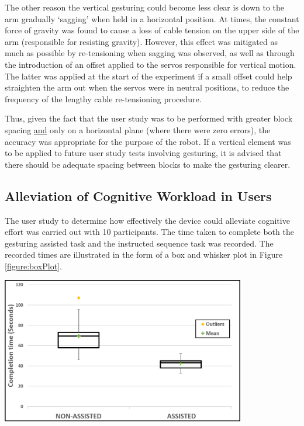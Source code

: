 \documentclass[11pt]{article}
\begin{document}
The other reason the vertical gesturing could become less clear is down to the arm gradually `sagging' when held in a horizontal position. At times, the constant force of gravity was found to cause a loss of cable tension on the upper side of the arm (responsible for resisting gravity). However, this effect was mitigated as much as possible by re-tensioning when sagging was observed, as well as through the introduction of an offset applied to the servos responsible for vertical motion. The latter was applied at the start of the experiment if a small offset could help straighten the arm out when the servos were in neutral positions, to reduce the frequency of the lengthy cable re-tensioning procedure.

Thus, given the fact that the user study was to be performed with greater block spacing \underline{and} only on a horizontal plane (where there were zero errors), the accuracy was appropriate for the purpose of the robot. If a vertical element was to be applied to future user study tests involving gesturing, it is advised that there should be adequate spacing between blocks to make the gesturing clearer.

\subsection{Alleviation of Cognitive Workload in Users}

The user study to determine how effectively the device could alleviate cognitive effort was carried out with 10 participants. The time taken to complete both the gesturing assisted task and the instructed sequence task was recorded. The recorded times are illustrated in the form of a box and whisker plot in Figure \ref{figure:boxPlot}.

\begin{center}
\includegraphics[width=0.8\textwidth]{images/boxPlot.png}
\label{figure:boxPlot}
\end{center}
\end{document}
